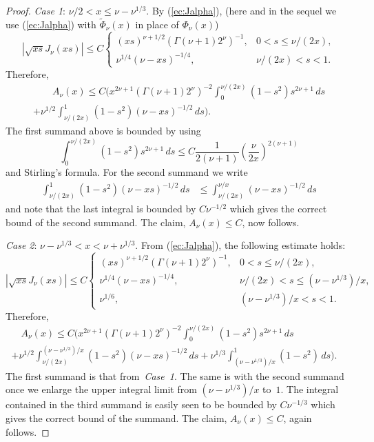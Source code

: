 \documentclass[leqno,a4paper]{amsart}
\begin{document}
\begin{proof}
\textit{Case 1}: $\nu/2<x\le \nu-\nu^{1/3}$. By (\ref{ec:Jalpha}), (here
and in the sequel we use (\ref{ec:Jalpha}) with $\widetilde{\Phi}_\nu(x)$
in place of $\Phi_\nu(x)$)
\begin{equation*}
|\sqrt{xs}J_\nu(xs)|\le C
\begin{cases}
(xs)^{\nu+1/2}(\Gamma(\nu+1)2^{\nu})^{-1},& 0<s\le \nu/(2x),\\
\nu^{1/4}(\nu-xs)^{-1/4}, & \nu/(2x)<s< 1.
\end{cases}
\end{equation*}
Therefore,
\begin{multline*}
\qquad
A_\nu(x) \le C\bigg(x^{2\nu+1}(\Gamma(\nu+1)2^{\nu})^{-2}
\int_0^{\nu/(2x)}(1-s^2) s^{2\nu+1}\, ds\\
+ \nu^{1/2}\int_{\nu/(2x)}^1(1-s^2) (\nu-xs)^{-1/2}\,ds \bigg).
\qquad
\end{multline*}
The first summand above is bounded by using
\begin{equation*}
\int_0^{\nu/(2x)}(1-s^2) s^{2\nu+1}\, ds\le C
\frac1{2(\nu+1)}\left(\frac{\nu}{2x}\right)^{2(\nu+1)}
\end{equation*}
and Stirling's formula. For the second summand we write
\begin{align*}
\int_{\nu/(2x)}^1(1-s^2) (\nu-xs)^{-1/2}\,ds
&\le \int_{\nu/(2x)}^{\nu/x}(\nu-xs)^{-1/2}\, ds
\end{align*}
and note that the last integral is bounded by $C\nu^{-1/2}$ which gives the
correct bound of the second summand. The claim,
$A_\nu(x)\le C$, now follows.

\textit{Case 2}: $\nu-\nu^{1/3}<x<\nu+\nu^{1/3}$.
From (\ref{ec:Jalpha}), the following estimate holds:
\begin{equation*}
|\sqrt{xs}J_\nu(xs)|\le C
\begin{cases}
(xs)^{\nu+1/2}(\Gamma(\nu+1)2^{\nu})^{-1}, & 0<s\le \nu/(2x),\\
\nu^{1/4}(\nu-xs)^{-1/4}, & \nu/(2x) < s\le (\nu-\nu^{1/3})/x,\\
\nu^{1/6}, & (\nu-\nu^{1/3})/x<s<1.
\end{cases}
\end{equation*}
Therefore,
\begin{multline*}
\quad
A_\nu(x)
\le C\bigg(x^{2\nu+1}(\Gamma(\nu+1)2^{\nu})^{-2}
\int_0^{\nu/(2x)}(1-s^2) s^{2\nu+1}\, ds\\
+ \nu^{1/2}\int_{\nu/(2x)}^{(\nu-\nu^{1/3})/x}
(1-s^2) (\nu-xs)^{-1/2}\,ds +
\nu^{1/3}\int_{(\nu-\nu^{1/3})/x}^1 (1-s^2)\,ds\bigg).
\quad
\end{multline*}
The first summand is that from~\textit{Case~1}. The same is with the second
summand once we enlarge the upper integral limit from $(\nu-\nu^{1/3})/x$
to~$1$.
The integral contained in the third summand is easily seen to be bounded by
$C\nu^{-1/3}$ which gives the correct bound of the summand. The claim,
$A_\nu(x)\le C$, again follows.


\end{proof}
\end{document}
